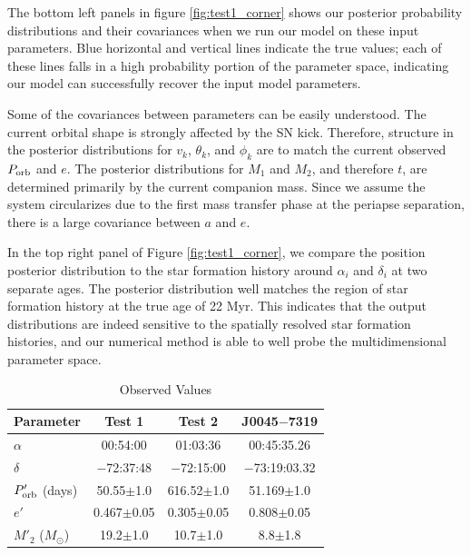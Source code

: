 \documentclass[usenatbib]{mnras}
\newcommand{\Msun}{\ifmmode {M_{\odot}}\else${M_{\odot}}$\fi}
\begin{document}
The bottom left panels in figure \ref{fig:test1_corner} shows our posterior probability distributions and their covariances when we run our model on these input parameters. Blue horizontal and vertical lines indicate the true values; each of these lines falls in a high probability portion of the parameter space, indicating our model can successfully recover the input model parameters. 

Some of the covariances between parameters can be easily understood. The current orbital shape is strongly affected by the SN kick. Therefore, structure in the posterior distributions for $v_k$, $\theta_k$, and $\phi_k$ are to match the current observed $P_{\rm orb}$ and $e$. The posterior distributions for $M_1$ and $M_2$, and therefore $t$, are determined primarily by the current companion mass. Since we assume the system circularizes due to the first mass transfer phase at the periapse separation, there is a large covariance between $a$ and $e$.

In the top right panel of Figure \ref{fig:test1_corner}, we compare the position posterior distribution to the star formation history around $\alpha_i$ and $\delta_i$ at two separate ages. The posterior distribution well matches the region of star formation history at the true age of 22 Myr. This indicates that the output distributions are indeed sensitive to the spatially resolved star formation histories, and our numerical method is able to well probe the multidimensional parameter space.

\begin{table}
\label{tab:observations}
\begin{center}
\caption{Observed Values}
\begin{tabular}{lccc} 
\toprule
Parameter & Test 1 & Test 2 & J0045$-$7319 \\
\midrule
$\alpha$ & 00:54:00 & 01:03:36 & 00:45:35.26 \\
$\delta$ & $-$72:37:48 & $-$72:15:00 & $-$73:19:03.32 \\
$P'_{\rm orb}$ (days) & 50.55$\pm$1.0 & 616.52$\pm$1.0 & 51.169$\pm$1.0 \\
$e'$ & 0.467$\pm$0.05 & 0.305$\pm$0.05 & 0.808$\pm$0.05 \\
$M'_2$ (\Msun) & 19.2$\pm$1.0 & 10.7$\pm$1.0 & 8.8$\pm$1.8 \\
\bottomrule
\end{tabular}
\end{center}
\end{table}
\end{document}
